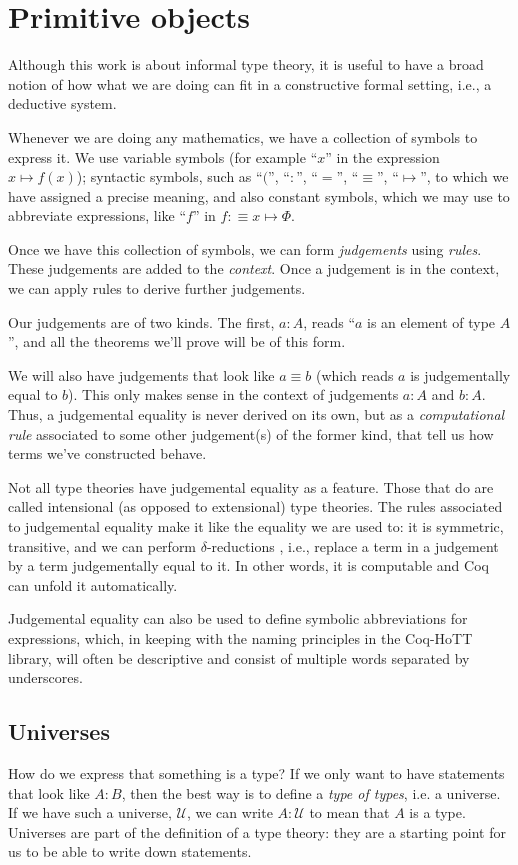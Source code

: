 \documentclass[12 pt]{amsart}
\theoremstyle{definition}
\theoremstyle{remark}
\newcommand{\Type}{\mathcal{U}}
\begin{document}
\section{Primitive objects}

Although this work is about informal type theory, it is useful to have a broad notion of how what we are doing can fit in a constructive formal setting, i.e., a deductive system. 

Whenever we are doing any mathematics, we have a collection of symbols to express it. We use variable symbols (for example ``$x$'' in the expression $x \mapsto f(x)$); syntactic symbols, such as ``$($'', ``$:$'', ``$=$'', ``$\equiv$'', ``$\mapsto$'', to which we have assigned a precise meaning, and also constant symbols, which we may use to abbreviate expressions, like ``$f$'' in $f :\equiv x \mapsto \Phi$.

Once we have this collection of symbols, we can form \textit{judgements} using \textit{rules}. These judgements are added to the \textit{context}. Once a judgement is in the context, we can apply rules to derive further judgements.

Our judgements are of two kinds. The first, $a : A$, reads ``$a$ is an element of type $A$'', and all the theorems we'll prove will be of this form.

We will also have judgements that look like $a\equiv b$ (which reads $a$ is judgementally equal to $b$). This only makes sense in the context of judgements $a : A$ and $b : A$. Thus, a judgemental equality is never derived on its own, but as a \textit{computational rule} associated to some other judgement(s) of the former kind, that tell us how terms we've constructed behave.

Not all type theories have judgemental equality as a feature. Those that do are called intensional (as opposed to extensional) type theories. The rules associated to judgemental equality make it like the equality we are used to: it is symmetric, transitive, and we can perform $\delta$-reductions \cite[Conversion Rules]{coq-refman-8.19}, i.e., replace a term in a judgement by a term judgementally equal to it. In other words, it is computable and Coq can unfold it automatically.

Judgemental equality can also be used to define symbolic abbreviations for expressions, which, in keeping with the naming principles in the Coq-HoTT library, will often be descriptive and consist of multiple words separated by underscores.

\subsection{Universes}
How do we express that something is a type? If we only want to have statements that look like $A : B$, then the best way is to define a \textit{type of types}, i.e. a universe. If we have such a universe, $\Type$, we can write $A : \Type$ to mean that $A$ is a type. Universes are part of the definition of a type theory: they are a starting point for us to be able to write down statements.
\end{document}
